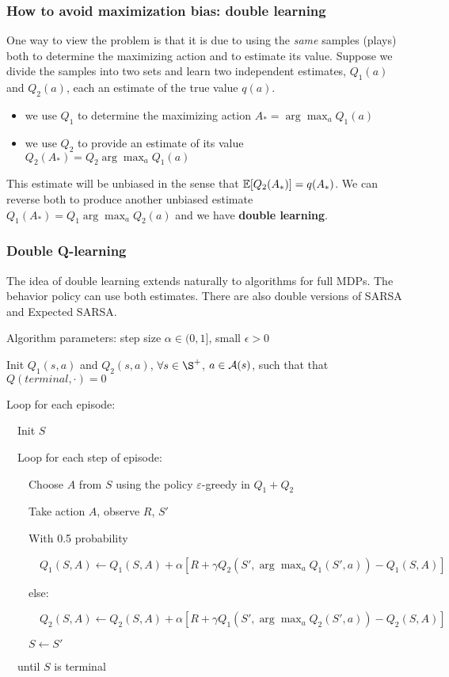\documentclass[sutton_barto_notes.tex]{subfiles}
\begin{document}
\subsubsection{How to avoid maximization bias: double learning}

One way to view the problem is that it is due to using the \textit{same} samples (plays) both to determine the maximizing action and to estimate its value.
Suppose we divide the samples into two sets and learn two independent estimates, $Q_1(a)$ and $Q_2(a)$, each an estimate of the true value $q(a)$.
\begin{itemize}
\item we use $Q_1$ to determine the maximizing action $A_* = \arg\max_a Q_1(a)$
\item we use $Q_2$ to provide an estimate of its value $Q_2(A_*) = Q_2 \arg\max_a Q_1(a)$
\end{itemize}
This estimate will be unbiased in the sense that $\operatorname*{\mathbb{E}} [Q_2(A_*)] = q(A_*)$. We can reverse both to produce another unbiased estimate $Q_1(A_*) = Q_1 \arg\max_a Q_2(a)$ and we have \textbf{double learning}.

\subsubsection{Double Q-learning}

The idea of double learning extends naturally to algorithms for full MDPs. The behavior policy can use both estimates. There are also double versions of SARSA and Expected SARSA.

\begin{tcolorbox}[width=1.1\textwidth,title={Double Q-learning for estimating $Q_1 \approx Q_2 \approx q_*$}]
Algorithm parameters: step size $\alpha \in (0,1]$, small $\epsilon > 0$

Init $Q_1(s,a)$ and $Q_2(s,a)$, $\forall s \in \S^+$, $a \in \operatorname*{\mathcal{A}}(s)$, such that that $Q(terminal,\cdot)=0$

Loop for each episode:

$\quad$Init $S$

$\quad$Loop for each step of episode:

$\quad\quad$Choose $A$ from $S$ using the policy $\varepsilon$-greedy in $Q_1 + Q_2$

$\quad\quad$Take action $A$, observe $R$, $S'$

$\quad\quad$With 0.5 probability

$\quad\quad\quad Q_1(S, A) \leftarrow Q_1(S, A) + \alpha [ R + \gamma Q_2( S', \arg\max_a Q_1(S',a) ) - Q_1(S, A)]$

$\quad\quad$else:

$\quad\quad\quad Q_2(S, A) \leftarrow Q_2(S, A) + \alpha [ R + \gamma Q_1( S', \arg\max_a Q_2(S',a) ) - Q_2(S, A)]$

$\quad\quad S \leftarrow S'$

$\quad$until $S$ is terminal
\end{tcolorbox}
\end{document}
